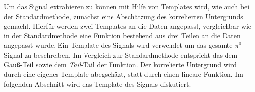 Um das Signal extrahieren zu k\"onnen mit Hilfe von Templates wird, wie auch bei der Standardmethode, zun\"achst eine Absch\"atzung des korrelierten Untergrunds gemacht.
Hierf\"ur werden zwei Templates an die Daten angepasst, vergleichbar wie in der Standardmethode eine Funktion bestehend aus drei Teilen an die Daten angepasst wurde.
Ein Template des Signals wird verwendet um das gesamte $\pi^{0}$ Signal zu beschreiben.
Im Vergleich zur Standardmethode entspricht das dem Gau{\ss}-Teil sowie dem \textit{Tail}-Tail der Funktion.
Der korrelierte Untergrund wird durch eine eigenes Template abegsch\"azt, statt durch einen lineare Funktion.
\newline
Im folgenden Abschnitt wird das Template des Signals diskutiert. 
